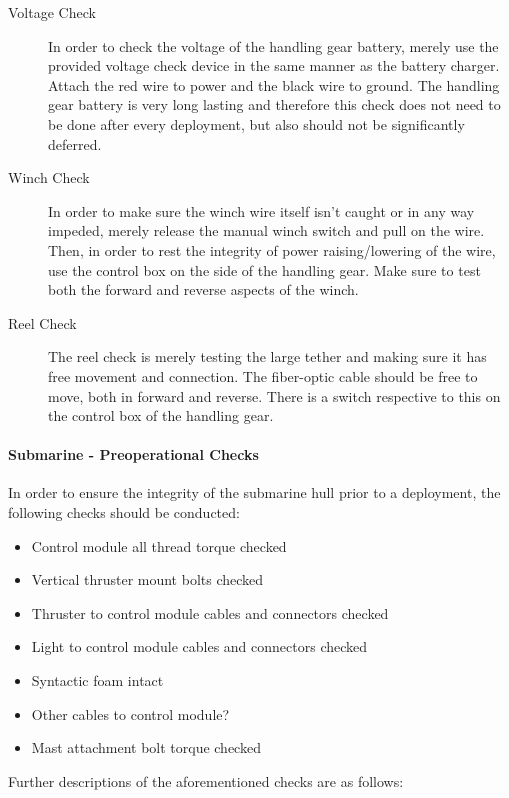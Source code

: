 \documentclass[
10pt, %
a4paper, %
oneside, %
headinclude,footinclude, %
BCOR5mm, %
]{scrartcl}
\begin{document}
\begin{description}
	\item[Voltage Check] In order to check the voltage of the handling gear battery, merely use the provided voltage check device in the same manner as the battery charger. Attach the red wire to power and the black wire to ground. The handling gear battery is very long lasting and therefore this check does not need to be done after every deployment, but also should not be significantly deferred.
	\item[Winch Check] In order to make sure the winch wire itself isn't caught or in any way impeded, merely release the manual winch switch and pull on the wire. Then, in order to rest the integrity of power raising/lowering of the wire, use the control box on the side of the handling gear. Make sure to test both the forward and reverse aspects of the winch. 
	\item[Reel Check] The reel check is merely testing the large tether and making sure it has free movement and connection. The fiber-optic cable should be free to move, both in forward and reverse. There is a switch respective to this on the control box of the handling gear.
\end{description}

\paragraph{Submarine - Preoperational Checks} In order to ensure the integrity of the submarine hull prior to a deployment, the following checks should be conducted:

\begin{itemize}[noitemsep] %
	\item Control module all thread torque checked
	\item Vertical thruster mount bolts checked
	\item Thruster to control module cables and connectors checked
	\item Light to control module cables and connectors checked
	\item Syntactic foam intact
	\item Other cables to control module?
	\item Mast attachment bolt torque checked
\end{itemize}

Further descriptions of the aforementioned checks are as follows:
\end{document}
